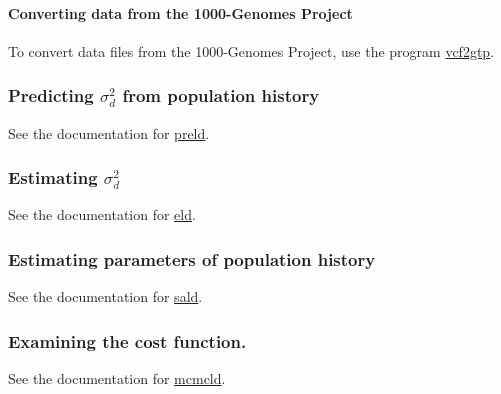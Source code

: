 \paragraph*{Converting data from the 1000-\/\+Genomes Project}

To convert data files from the 1000-\/\+Genomes Project, use the program \hyperlink{vcf2gtp_8py_vcf2gtp}{vcf2gtp}.

\subsubsection*{Predicting $\sigma_d^2$ from population history}

See the documentation for \hyperlink{preld_preld}{preld}.

\subsubsection*{Estimating $\sigma_d^2$}

See the documentation for \hyperlink{eld}{eld}.

\subsubsection*{Estimating parameters of population history}

See the documentation for \hyperlink{sald_sald}{sald}.

\subsubsection*{Examining the cost function.}

See the documentation for \hyperlink{mcmcld_mcmcld}{mcmcld}. 